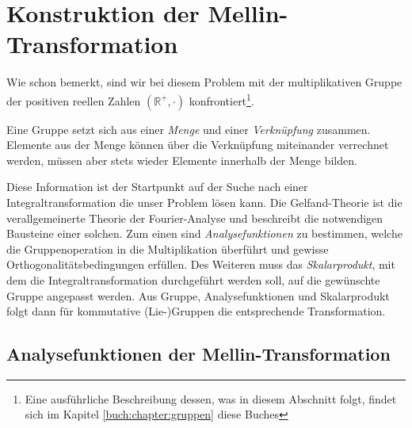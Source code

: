 %
%
%

\section{Konstruktion der Mellin-Transformation
\label{mellin:section:teil2}}
Wie schon bemerkt, sind wir bei diesem Problem mit der multiplikativen 
Gruppe der positiven reellen Zahlen $(\mathbb{R^+},\cdot)$ konfrontiert\footnote
{Eine ausführliche Beschreibung dessen, was in diesem Abschnitt 
folgt, findet sich im Kapitel \ref{buch:chapter:gruppen} diese Buches}.
\begin{definition}
    Eine Gruppe setzt sich aus einer {\em Menge} und einer 
    {\em Verknüpfung} zusammen. 
    Elemente aus der Menge können über die Verknüpfung miteinander 
    verrechnet werden, müssen aber stets wieder Elemente innerhalb der Menge bilden.
\end{definition}
Diese Information ist der Startpunkt auf der Suche nach einer 
Integraltransformation die unser Problem lösen kann.
Die Gelfand-Theorie ist die verallgemeinerte Theorie der Fourier-Analyse und 
beschreibt die notwendigen Bausteine einer solchen.
Zum einen sind {\em Analysefunktionen} zu bestimmen, welche die 
Gruppenoperation in die Multiplikation überführt und gewisse 
Orthogonalitätsbedingungen erfüllen. 
Des Weiteren muss das {\em Skalarprodukt}, mit dem die Integraltransformation 
durchgeführt werden soll, auf die gewünschte Gruppe angepasst werden.
Aus Gruppe, Analysefunktionen und Skalarprodukt folgt dann
für kommutative (Lie-)Gruppen die entsprechende Transformation.





\subsection{Analysefunktionen der Mellin-Transformation
\label{mellin:subsection:analysefunktionen}}

